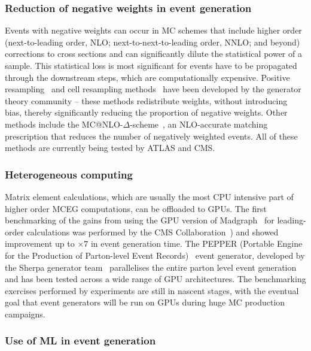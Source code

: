 \documentclass[10pt,a4paper]{article}
\begin{document}
\subsubsection{Reduction of negative weights in event
generation}\label{reduction-of-negative-weights-in-event-generation}

Events with negative weights can occur in MC schemes that include
higher order (next-to-leading order, NLO; next-to-next-to-leading order, NNLO; and beyond)
corrections to cross sections and can
significantly dilute the statistical power of a sample. This statistical loss is
most significant for events have to be propagated through the downstream steps,
which are computationally expensive. Positive resampling~\cite{Andersen:2020sjs}
and cell resampling methods~\cite{Andersen:2021mvw} have been developed by the
generator theory community -- these methods redistribute weights, without
introducing bias, thereby significantly reducing the proportion of negative
weights. Other methods include the
MC@NLO-$\Delta$-scheme~\cite{Frederix:2020trv}, an NLO-accurate matching
prescription that reduces the number of negatively weighted events. All of these
methods are currently being tested by ATLAS and CMS.

\subsubsection{Heterogeneous computing}\label{heterogeneous-computing}

Matrix element calculations, which are usually the most CPU intensive part of
higher order MCEG computations, can be offloaded to GPUs. The first benchmarking
of the gains from using the GPU version of
Madgraph~\cite{Alwall:2014hca, Hageboeck:2023blb, Valassi:2022dkc, Wettersten:2023ekm}
for leading-order calculations was
performed by the CMS Collaboration~\cite{CMS-DP-2024-086}) and showed
improvement up to $\times 7$ in event generation time. The PEPPER (Portable
Engine for the Production of Parton-level Event Records)~\cite{Bothmann:2023gew}
event generator, developed by the Sherpa generator team~\cite{Sherpa:2019gpd}
parallelises the entire parton level event generation and has been tested across
a wide range of GPU architectures. The benchmarking exercises performed by
experiments are still in nascent stages, with the eventual goal that event
generators will be run on GPUs during huge MC production campaigns.

\subsubsection{Use of ML in event generation}
\label{use-of-ml-in-event-generation}
\end{document}
